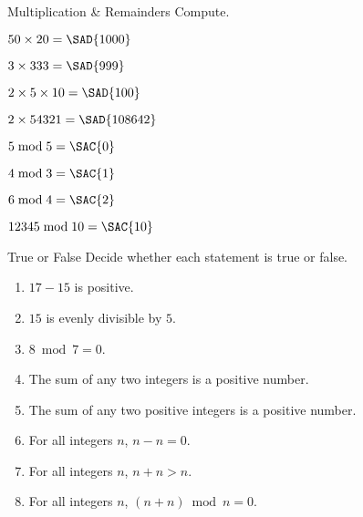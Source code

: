 \documentclass[12pt,letterpaper]{article}
\begin{document}
\begin{problem}{Multiplication \& Remainders}
  Compute.

  \begin{itemize}
    \begin{multicols}{2}
      \item \(50 \times 20 = \SAD{1000}\)
      \item \(3 \times 333 = \SAD{999}\)
      \item \(2 \times 5 \times 10 = \SAD{100}\)
      \item \(2 \times 54321 = \SAD{108642}\)
      \item \(5 \bmod 5 = \SAC{0}\)
      \item \(4 \bmod 3 = \SAC{1}\)
      \item \(6 \bmod 4 = \SAC{2}\)
      \item \(12345 \bmod 10 = \SAC{10}\)
    \end{multicols}
  \end{itemize}
\end{problem}

\begin{problem}{True or False}
  Decide whether each statement is true or false.

  \begin{enumerate}
    \item \(17 - 15\) is positive. \hfill \TFTrue
    \item \(15\) is evenly divisible by \(5\). \hfill \TFTrue
    \item \(8 \bmod 7 = 0\). \hfill \TFFalse
    \item The sum of any two integers is a positive number. \hfill \TFFalse
    \item The sum of any two positive integers is a positive number.
    \hfill \TFTrue
    \item For all integers \(n\), \(n - n = 0\). \hfill \TFTrue
    \item For all integers \(n\), \(n + n > n\). \hfill \TFFalse
    \item For all integers \(n\), \((n + n) \bmod n = 0\). \hfill \TFTrue
  \end{enumerate}
\end{problem}
\end{document}
